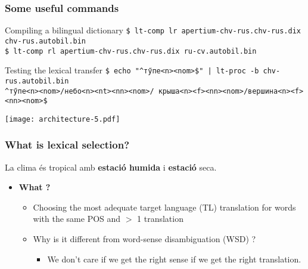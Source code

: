 \documentclass[10pt,xetex]{beamer} %
\begin{document}
\begin{frame}
  \frametitle{Some useful commands}

\begin{block}{Compiling a bilingual dictionary}
{\tt \$ lt-comp lr apertium-chv-rus.chv-rus.dix chv-rus.autobil.bin} \\
{\tt \$ lt-comp rl apertium-chv-rus.chv-rus.dix ru-cv.autobil.bin}
\end{block}
\begin{block}{Testing the lexical transfer}
{\tt \$ echo "\^{}тӳпе<n><nom>\$" | lt-proc -b chv-rus.autobil.bin }\\
{\tt \^{}тӳпе<n><nom>/небо<n><nt><nn><nom>/ крыша<n><f><nn><nom>/вершина<n><f><nn><nom>\$ }

\end{block}

\end{frame}



\begin{frame}

\begin{center}
\texttt{[image: architecture-5.pdf]}
\end{center}

\end{frame}

\begin{frame}
\frametitle{What is lexical selection?}

\begin{center}
  La clima és tropical amb {\bf estació humida} i {\bf estació} seca.
\end{center}

\begin{itemize}
  \item {\bf What ?}
  \begin{itemize}
    \item Choosing the most adequate target language (TL) translation
        for words with the same POS and $>$ 1 translation
    \item Why is it different from word-sense disambiguation (WSD) ?
    \begin{itemize}
      \item We don't care if we get the right sense if we get the
        right translation.
    \end{itemize}
  \end{itemize}

\end{itemize}

\end{frame}
\end{document}
